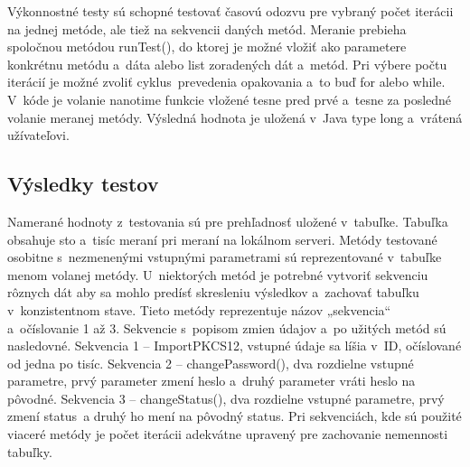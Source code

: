 \documentclass[
  digital, %
  table,   %
oneside,
  nolof,     %
  nolot,     %
]{fithesis3}
\begin{document}
Výkonnostné testy sú schopné testovať časovú odozvu pre vybraný počet iterácii na jednej metóde, ale tiež na sekvencii daných metód. Meranie prebieha spoločnou metódou runTest(), do ktorej je možné vložiť ako parametere konkrétnu metódu a~dáta alebo list zoradených dát a~metód. Pri výbere počtu iterácií je možné zvoliť cyklus~prevedenia opakovania a~to buď for alebo while.  V~kóde je  volanie nanotime funkcie vložené tesne pred prvé a~tesne za posledné volanie meranej metódy. Výsledná hodnota je uložená v~Java type long a~vrátená užívateľovi.
\subsection{Výsledky testov}
Namerané hodnoty z~testovania sú pre prehľadnosť uložené v~tabuľke. Tabuľka obsahuje sto a~tisíc meraní pri meraní na lokálnom serveri. Metódy testované osobitne s~nezmenenými vstupnými parametrami sú reprezentované v~tabuľke menom volanej metódy. U~niektorých metód je potrebné vytvoriť sekvenciu rôznych dát aby sa mohlo predísť skresleniu výsledkov a~zachovať tabuľku v~konzistentnom stave. Tieto metódy reprezentuje názov „sekvencia“ a~očíslovanie 1 až 3. Sekvencie s~popisom zmien údajov  a~po užitých metód sú nasledovné.
Sekvencia 1 – ImportPKCS12, vstupné údaje sa líšia v~ID, očíslované od jedna po tisíc.
Sekvencia 2 – changePassword(), dva rozdielne vstupné parametre, prvý parameter zmení heslo  a~druhý parameter vráti heslo na pôvodné.
Sekvencia 3 – changeStatus(), dva rozdielne vstupné parametre, prvý zmení status~a druhý ho mení na pôvodný status. 
Pri sekvenciách, kde sú použité viaceré metódy je počet iterácii adekvátne upravený pre zachovanie nemennosti tabuľky. 
\begin{table}[htbp]
	\begin{center}
	\end{center}
	\caption{Ukážka nameraných hodnôt}
	\label{table:power}
\end{table}
\end{document}
